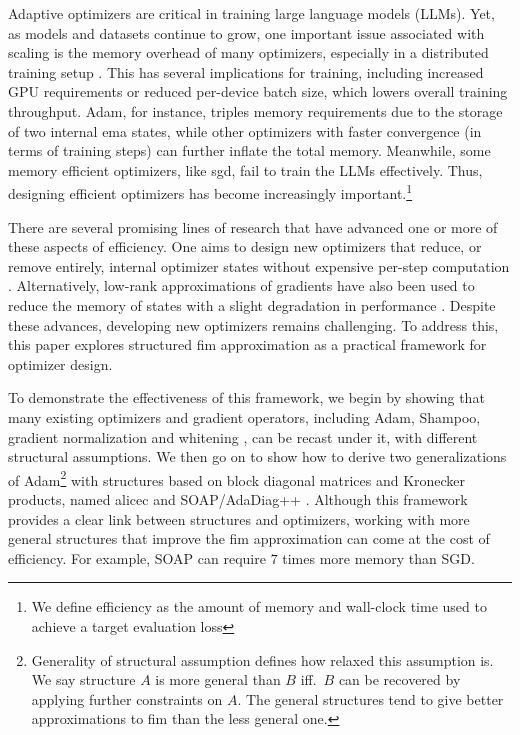 \label{sec: introduction}
Adaptive optimizers are critical in training large language models (LLMs). Yet, as models and datasets continue to grow, one important issue associated with scaling is the memory overhead of many optimizers, especially in a distributed training setup \citep{llama3, korthikanti2023reducing}. This has several implications for training, including increased GPU requirements or reduced per-device batch size, which lowers overall training throughput. Adam, for instance, triples memory requirements due to the storage of two internal \gls{ema} states, while other optimizers \citep{gupta2018shampoo, vyas2024soap} with faster convergence (in terms of training steps) can further inflate the total memory.  Meanwhile, some memory efficient optimizers, like \gls{sgd}, fail to train the LLMs effectively. Thus, designing efficient optimizers  has become increasingly important.\footnote{We define efficiency as the amount of memory and wall-clock time used to achieve a target evaluation loss}

There are several promising lines of research that have advanced one or more of these aspects of efficiency. One aims to design new optimizers that reduce, or remove entirely, internal optimizer states without expensive per-step computation \citep{ma2024swan, jordan2024muon, zhang2024adam, xu2024adamlearningratescaling, zhu2024apollo}. Alternatively, low-rank approximations of gradients have also been used to reduce the memory of states with a slight degradation in performance \citep{hu2021lora, lialin2023relora, zhao2024galore, chen2024fira, si2024flora}. 
Despite these advances, developing new optimizers remains challenging. To address this, this paper explores structured \gls{fim} approximation as a practical framework for optimizer design.

To demonstrate the effectiveness of this framework, we begin by showing that many existing optimizers and gradient operators, including Adam, Shampoo, gradient normalization and whitening \citep{zhang2024adam, gupta2018shampoo, vyas2024soap, you2019lamb, ma2024swan, jordan2024muon}, can be recast under it, with different structural assumptions. We then go on to show how to derive two generalizations of Adam\footnote{Generality of structural assumption defines how relaxed this assumption is. We say structure $A$ is more general than $B$ iff.~$B$ can be recovered by applying further constraints on $A$. The general structures tend to give better approximations to \gls{fim} than the less general one. } with structures based on block diagonal matrices and Kronecker products, named \gls{alicec} and SOAP/AdaDiag++ \citep{vyas2024soap, anonymous2024improving}. 
Although this framework provides a clear link between structures and optimizers, working with more general structures that improve the \gls{fim} approximation can come at the cost of efficiency. For example, SOAP can require $7$ times more memory than SGD.  

